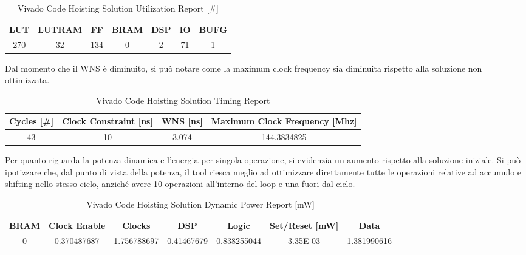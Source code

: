 \begin{table}[H]
    \centering
    \begin{tabular}{|c|c|c|c|c|c|c|}
        \hline
        \textbf{LUT} & \textbf{LUTRAM} & \textbf{FF} & \textbf{BRAM} & \textbf{DSP} & \textbf{IO} & \textbf{BUFG} \\
        \hline
        270 & 32 & 134 & 0 & 2 & 71 & 1 \\
        \hline
    \end{tabular}
    \caption{Vivado Code Hoisting Solution Utilization Report [\#]}
    \label{tab:vivado-code-hoisting-solution-utilization-reproot}
\end{table}

Dal momento che il WNS è diminuito, si può notare come la maximum clock frequency sia diminuita rispetto alla soluzione non ottimizzata.

\begin{table}[H]
    \centering
    \begin{tabular}{|c|c|c|c|}
        \hline
        \textbf{Cycles} [\#] & \textbf{Clock Constraint} [ns] & \textbf{WNS} [ns] & \textbf{Maximum Clock Frequency} [Mhz] \\
        \hline
        43 & 10 & 3.074 & 144.3834825 \\
        \hline
    \end{tabular}
    \caption{Vivado Code Hoisting Solution Timing Report}
    \label{tab:vivado-code-hoisting-solution-timing-reproot}
\end{table}

Per quanto riguarda la potenza dinamica e l'energia per singola operazione, si evidenzia un aumento rispetto alla soluzione iniziale. Si può ipotizzare che, dal punto di vista della potenza, il tool riesca meglio ad ottimizzare direttamente tutte le operazioni relative ad accumulo e shifting nello stesso ciclo, anziché avere 10 operazioni all'interno del loop e una fuori dal ciclo. 
\begin{table}[H]
    \centering
    \begin{tabular}{|c|c|c|c|c|c|c|}
        \hline
        \textbf{BRAM} & \textbf{Clock Enable} & \textbf{Clocks} & \textbf{DSP} & \textbf{Logic} & \textbf{Set/Reset} [mW] & \textbf{Data} \\
        \hline
        0 & 0.370487687 & 1.756788697 & 0.41467679 & 0.838255044 & 3.35E-03 & 1.381990616 \\
        \hline
    \end{tabular}
    \caption{Vivado Code Hoisting Solution Dynamic Power Report [mW]}
    \label{tab:vivado-code-hoisting-solution-dynamic-power-reproot}
\end{table}

